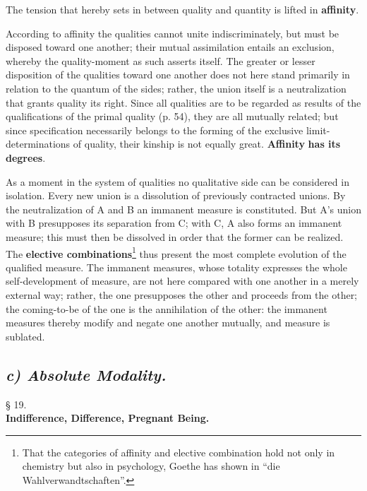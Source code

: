 \documentclass[12pt,a4paper,openany]{book}
\newcommand{\opage}[1]{\marginnote{\footnotesize\textit{[#1]}}}
\newcommand{\underafsnit}[1]{\subsection*{\centering\emph{#1}}\addcontentsline{toc}{subsection}{#1}}
\newcommand{\paragraf}[2]{\begin{center}§ #1.\\[0.2em]\textbf{#2}\end{center}}
\begin{document}
The tension that hereby sets in between quality and quantity is lifted in \textbf{affinity}.

According to affinity the qualities cannot unite indiscriminately, but must be disposed toward one another; their mutual assimilation entails an exclusion, whereby the quality-moment as such asserts itself. The greater or lesser disposition of the qualities toward one another does not here stand primarily in relation to the quantum of the sides; rather, the union itself is a neutralization that grants quality its right. Since all qualities are to be regarded as results of the qualifications of the primal quality (p. 54), they are all mutually related; but since specification necessarily belongs to the forming of the exclusive limit-determinations of quality, their kinship is not equally great. \textbf{Affinity} \textbf{has its degrees}.

As a moment in the system of qualities no qualitative side can be considered in isolation. Every new union
\setcounter{footnote}{0}%
\opage{70}is a dissolution of previously contracted unions. By the neutralization of A and B an immanent measure is constituted. But A's union with B presupposes its separation from C; with C, A also forms an immanent measure; this must then be dissolved in order that the former can be realized. The \textbf{elective combinations}\footnote{That the categories of affinity and elective combination hold not only in chemistry but also in psychology, Goethe has shown in ``die Wahlverwandtschaften''.} thus present the most complete evolution of the qualified measure. The immanent measures, whose totality expresses the whole self-development of measure, are not here compared with one another in a merely external way; rather, the one presupposes the other and proceeds from the other; the coming-to-be of the one is the annihilation of the other: the immanent measures thereby modify and negate one another mutually, and measure is sublated.

\underafsnit{c) Absolute Modality.}
\paragraf{19}{Indifference, Difference, Pregnant Being.}
\end{document}
